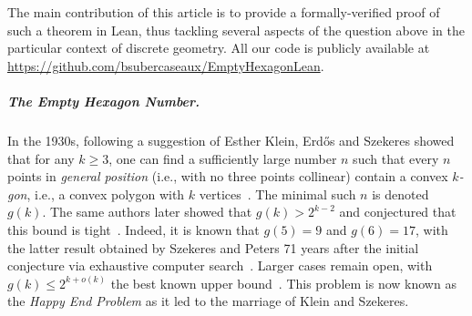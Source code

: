 % 

The main contribution of this article is to provide a formally-verified proof of such a theorem in Lean, thus tackling several aspects of the question above in the particular context of discrete geometry.
All our code is publicly available at \url{https://github.com/bsubercaseaux/EmptyHexagonLean}.

\subparagraph*{The Empty Hexagon Number.}
In the 1930s,
following a suggestion of Esther Klein,
Erd\H{o}s and Szekeres showed that for any $k \geq 3$,
one can find a sufficiently large number $n$
such that every $n$ points in \emph{general position}
(i.e., with no three points collinear)
contain a convex \emph{$k$-gon}, i.e., a convex polygon with $k$ vertices~\cite{35erdos_combinatorial_problem_geometry}.
The minimal such $n$ is denoted $g(k)$.
The same authors later showed that $g(k) > 2^{k-2}$
and conjectured that this bound is tight~\cite{60erdos_some_extremum_problems_elementary_geometry}.
Indeed, it is known that $g(5) = 9$ and $g(6) = 17$,
with the latter result obtained by Szekeres and Peters 71 years after the initial conjecture
via exhaustive computer search~\cite{06szekeres_computer_solution_17_point_erdos_szekeres_problem}.
Larger cases remain open,
with $g(k) \leq 2^{k+o(k)}$ the best known upper bound~\cite{suk2017erdos,holmsen2017two}.
This problem is now known as the \emph{Happy End Problem}
as it led to the marriage of Klein and Szekeres.

